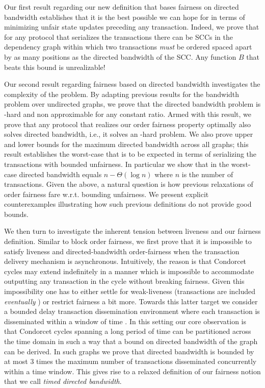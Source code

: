 Our first result regarding our new definition that bases fairness on directed bandwidth establishes that it is the best possible we can hope for in terms of minimizing unfair state updates preceding any transaction.
%
Indeed, we prove that for any protocol that serializes the transactions there can be SCCs in the dependency graph within which two transactions \emph{must} be ordered spaced apart by as many positions as the directed bandwidth of the SCC.
%
Any function $B$ that beats this bound is unrealizable!

Our second result regarding fairness based on directed bandwidth investigates the complexity of the problem.
%
By adapting previous results for the bandwidth problem over undirected graphs, we prove that the directed bandwidth problem is \NP-hard and non approximable for any constant ratio.
%
Armed with this result, we prove that any protocol that realizes our order fairness property optimally also solves directed bandwidth, i.e., it solves an \NP-hard problem.
%
We also prove upper and lower bounds for the maximum directed bandwidth across all graphs; this result establishes the worst-case that is to be expected in terms of serializing the transactions with bounded unfairness.
%
In particular we show that in the worst-case directed bandwidth equals $n-\Theta( \log n)$ where $n$ is the number of transactions.
%
Given the above, a natural question is how previous relaxations of order fairness fare w.r.t. bounding unfairness.
%
We present explicit counterexamples illustrating how such previous definitions do not provide good bounds.

We then turn to investigate the inherent tension between liveness and our fairness definition.
%
Similar to block order fairness, we first prove that it is impossible to satisfy liveness and directed-bandwidth order-fairness when the transaction delivery mechanism is asynchronous.
%
Intuitively, the reason is that Condorcet cycles may extend indefinitely in a manner which is impossible to accommodate outputting any transaction in the cycle without breaking fairness.
%
Given this impossibility one has to either settle for weak-liveness (transactions are included \emph{eventually} \cite{C:KZGJ20}) or restrict fairness a bit more.
%
Towards this latter target we consider a bounded delay transaction dissemination environment where each transaction is disseminated within a window of time \txDelay.
%
In this setting our core observation is that Condorcet cycles spanning a long period of time can be partitioned across the time domain in such a way that a bound on directed bandwidth of the graph can be derived.
%
In such graphs we prove that directed bandwidth is bounded by at most 3 times the maximum number of transactions disseminated concurrently within a \txDelay time window.
%
This gives rise to a relaxed definition of our fairness notion that we call \emph{timed directed bandwidth}.

